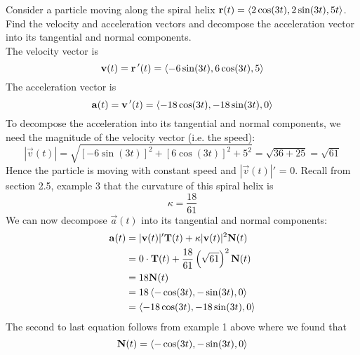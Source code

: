 \documentclass[handout]{ximera}
\begin{document}
\begin{example}[Example 5]
Consider a particle moving along the spiral helix $\mathbf r(t) =  \left\langle 2\cos(3t), 2\sin(3t), 5t\right\rangle$.
Find the velocity and acceleration vectors and decompose the acceleration vector into its tangential and normal components.\\
The velocity vector is
\[
\mathbf v(t) = \mathbf r\,'(t) = \left\langle -6\sin(3t), 6\cos(3t), 5\right\rangle
\]
The acceleration vector is
\[
\mathbf a(t) = \mathbf v\,'(t) = \left\langle -18\cos(3t), -18\sin(3t), 0\right\rangle
\]
To decompose the acceleration into its tangential and normal components, we need the magnitude of the velocity vector (i.e. the speed):
\[
|\vec v(t)| = \sqrt{[-6\sin(3t)]^2 + [6\cos(3t)]^2 + 5^2} = \sqrt{36 + 25} = \sqrt{61}
\]
Hence the particle is moving with constant speed and $|\vec v(t)|'$ = 0.
Recall from section 2.5, example 3 that the curvature of this spiral helix is
\[
\kappa = \frac{18}{61}
\]
We can now decompose $\vec a(t)$ into its tangential and normal components:
\begin{align*}
\mathbf a(t) &= |\mathbf v(t)|' \mathbf T(t) + \kappa |\mathbf v(t)|^2 \mathbf N(t) \\
          &= 0\cdot \mathbf T(t) + \frac{18}{61} \left(\sqrt{61}\right)^2 \mathbf N(t) \\
          &= 18 \mathbf N(t)\\
          &=18 \left\langle -\cos(3t), -\sin(3t), 0\right\rangle\\
          &= \left\langle -18\cos(3t), -18\sin(3t), 0\right\rangle
\end{align*}
The second to last equation follows from example 1 above where we found that
\[
\mathbf N(t) = \left\langle -\cos(3t), -\sin(3t), 0\right\rangle
\]

\end{example}

\end{document}
